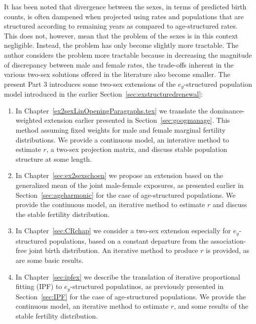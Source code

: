  \FloatBarrier
\label{Chapter:ex2sex}
It has been noted that divergence between the sexes, in terms of predicted birth
counts, is often dampened when projected using rates and populations that are
structured according to remaining years as compared to age-structured rates.
This does not, however, mean that the problem of the sexes is in this context
 negligible. Instead, the problem has
only become slightly more tractable. The author considers the problem more
tractable because in decreasing the magnitude of discrepancy between male and female
rates, the trade-offs inherent in the various two-sex solutions offered in the
literature also become smaller. The present Part 3 introduces some two-sex
extensions of the $e_y$-structured population model introduced in the earlier
Section~\ref{sec:exstructuredrenewal}:
\begin{enumerate}
  \item In Chapter~\ref{ex2sexLinOpeningParagraphs.tex} we
  translate the dominance-weighted extension earlier presented in
  Section~\ref{sec:googmanage}. This method assuming fixed weights for male and
  female marginal fertility distributions. We provide a continuous model, an
  interative method to estimate $r$, a two-sex projection matrix, and discuss
  stable population structure at some length.
  \item In Chapter~\ref{sec:ex2sexschoen} we propose an extension based on the
  generalized mean of the joint male-female exposures, as presented earlier in
  Section~\ref{sec:ageharmonic} for the case of age-structured populations. We
  provide the continuous model, an iterative method to estimate $r$ and discuss
  the stable fertility distribution.
  \item In Chapter~\ref{sec:CRchap} we consider a two-sex extension
  especially for $e_y$-structured populations, based on a constant departure
  from the association-free joint birth distribution. An iterative method to
  produce $r$ is provided, as are some basic results.
  \item In Chapter~\ref{sec:ipfex} we describe the translation of iterative
  proportional fitting (IPF) to $e_y$-structured populatinos, as previously
  presented in Section~\ref{sec:IPF} for the case of age-structured populations.
  We provide the continuous model, an iterative method to estimate $r$, and some
  results of the stable fertility distribution.
\end{enumerate}